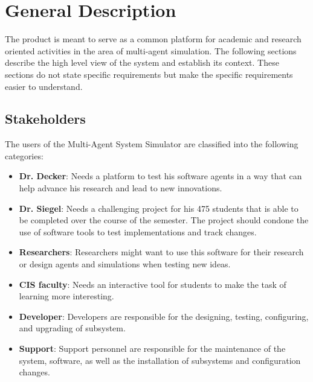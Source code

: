 \documentclass{article}
\begin{document}
\newpage
\section{General Description}
The product is meant to serve as a common platform for academic and research oriented activities in the area of multi-agent simulation. The following sections describe the high level view of the system and establish its context. These sections do not state specific requirements but make the specific requirements easier to understand.

\subsection{Stakeholders}
The users of the Multi-Agent System Simulator are classified into the following categories:

\begin{itemize}
\item{\textbf{Dr. Decker}: Needs a platform to test his software agents in a way that can help advance his research and lead to new innovations.}

\item{\textbf{Dr. Siegel}: Needs a challenging project for his 475 students that is able to be completed over the course of the semester. The project should condone the use of software tools to test implementations and  track changes.}

\item{\textbf{Researchers}: Researchers might want to use this software for their research or design agents and simulations when testing new ideas.}

\item{\textbf{CIS faculty}: Needs an interactive tool for students to make the task of learning more interesting.}

\item{\textbf{Developer}: Developers are responsible for the designing, testing, configuring, and upgrading of subsystem.}

\item{\textbf{Support}: Support personnel are responsible for the maintenance of the system, software, as well as the installation of subsystems and configuration changes.}
\end{itemize}
\end{document}

